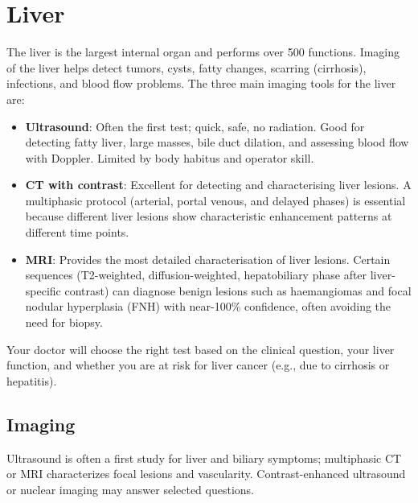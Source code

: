 \chapter{Liver}

\label{ch:ch45_liver}

The liver is the largest internal organ and performs over 500 functions. Imaging of the liver helps detect tumors, cysts, fatty changes, scarring (cirrhosis), infections, and blood flow problems. The three main imaging tools for the liver are:

\begin{itemize}
  \item \textbf{Ultrasound}: Often the first test; quick, safe, no radiation. Good for detecting fatty liver, large masses, bile duct dilation, and assessing blood flow with Doppler. Limited by body habitus and operator skill.
  \item \textbf{CT with contrast}: Excellent for detecting and characterising liver lesions. A multiphasic protocol (arterial, portal venous, and delayed phases) is essential because different liver lesions show characteristic enhancement patterns at different time points.
  \item \textbf{MRI}: Provides the most detailed characterisation of liver lesions. Certain sequences (T2-weighted, diffusion-weighted, hepatobiliary phase after liver-specific contrast) can diagnose benign lesions such as haemangiomas and focal nodular hyperplasia (FNH) with near-100\% confidence, often avoiding the need for biopsy.
\end{itemize}

Your doctor will choose the right test based on the clinical question, your liver function, and whether you are at risk for liver cancer (e.g., due to cirrhosis or hepatitis).


\section{Imaging}
Ultrasound is often a first study for liver and biliary symptoms; multiphasic CT or MRI characterizes focal lesions and vascularity. Contrast-enhanced ultrasound or nuclear imaging may answer selected questions.


